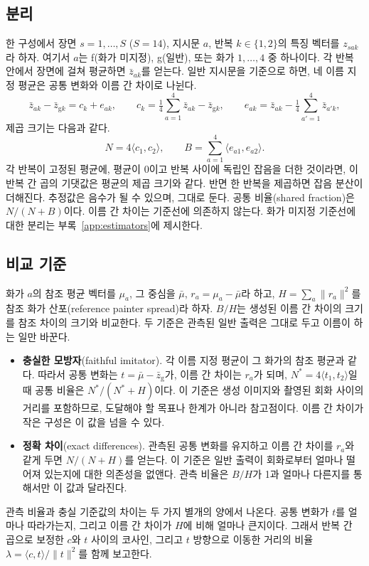 \documentclass[10pt]{article}
\newcommand{\ip}[2]{\langle #1,#2\rangle}
\newcommand{\term}[1]{\textsf{#1}}
\begin{document}
\subsection{분리}\label{sec:split}

한 구성에서 장면 $s=1,\dots,S$ ($S=14$), 지시문 $a$, 반복 $k\in\{1,2\}$의 특징 벡터를 $z_{sak}$라
하자. 여기서 $a$는 f(화가 미지정), g(일반), 또는 화가 $1,\dots,4$ 중 하나이다. 각 반복 안에서 장면에
걸쳐 평균하면 $\bar z_{ak}$를 얻는다. 일반 지시문을 기준으로 하면, 네 이름 지정 평균은 공통 변화와 이름
간 차이로 나뉜다.
\begin{equation}
\bar z_{ak}-\bar z_{\mathrm{g}k}=c_k+e_{ak},\qquad
c_k=\tfrac14\sum_{a=1}^4\bar z_{ak}-\bar z_{\mathrm{g}k},\qquad
e_{ak}=\bar z_{ak}-\tfrac14\sum_{a'=1}^4\bar z_{a'k},
\label{eq:split}
\end{equation}
제곱 크기는 다음과 같다.
\begin{equation}
N=4\ip{c_1}{c_2},\qquad B=\sum_{a=1}^4\ip{e_{a1}}{e_{a2}}.
\label{eq:components}
\end{equation}
각 반복이 고정된 평균에, 평균이 0이고 반복 사이에 독립인 잡음을 더한 것이라면, 이 반복 간 곱의 기댓값은
평균의 제곱 크기와 같다. 반면 한 반복을 제곱하면 잡음 분산이 더해진다. 추정값은 음수가 될 수 있으며,
그대로 둔다. \term{공통 비율}(shared fraction)은 $N/(N+B)$이다. 이름 간 차이는 기준선에 의존하지
않는다. 화가 미지정 기준선에 대한 분리는 부록~\ref{app:estimators}에 제시한다.

\subsection{비교 기준}\label{sec:benchmarks}

화가 $a$의 참조 평균 벡터를 $\mu_a$, 그 중심을 $\bar\mu$, $r_a=\mu_a-\bar\mu$라 하고,
$H=\sum_a\|r_a\|^2$를 \term{참조 화가 산포}(reference painter spread)라 하자. $B/H$는 생성된 이름 간
차이의 크기를 참조 차이의 크기와 비교한다. 두 기준은 관측된 일반 출력은 그대로 두고 이름이 하는 일만
바꾼다.
\begin{itemize}
\item \textbf{충실한 모방자}(faithful imitator). 각 이름 지정 평균이 그 화가의 참조 평균과 같다. 따라서
공통 변화는 $t=\bar\mu-\bar z_{\mathrm{g}}$가, 이름 간 차이는 $r_a$가 되며, $N^*=4\ip{t_1}{t_2}$일 때
공통 비율은 $N^*/(N^*+H)$이다. 이 기준은 생성 이미지와 촬영된 회화 사이의 거리를 포함하므로, 도달해야
할 목표나 한계가 아니라 참고점이다. 이름 간 차이가 작은 구성은 이 값을 넘을 수 있다.
\item \textbf{정확 차이}(exact differences). 관측된 공통 변화를 유지하고 이름 간 차이를 $r_a$와 같게 두면
$N/(N+H)$를 얻는다. 이 기준은 일반 출력이 회화로부터 얼마나 떨어져 있는지에 대한 의존성을 없앤다. 관측
비율은 $B/H$가 1과 얼마나 다른지를 통해서만 이 값과 달라진다.
\end{itemize}
관측 비율과 충실 기준값의 차이는 두 가지 별개의 양에서 나온다. 공통 변화가 $t$를 얼마나 따라가는지,
그리고 이름 간 차이가 $H$에 비해 얼마나 큰지이다. 그래서 반복 간 곱으로 보정한 $c$와 $t$ 사이의
코사인, 그리고 $t$ 방향으로 이동한 거리의 비율 $\lambda=\ip{c}{t}/\|t\|^2$를 함께 보고한다.
\end{document}
